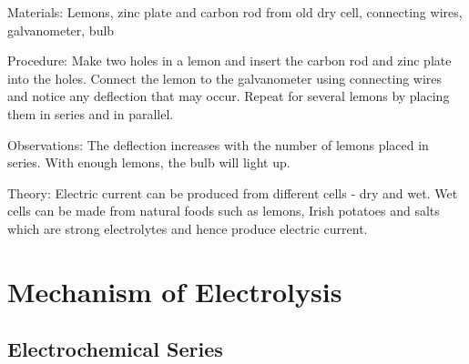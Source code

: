 \begin{multicols}{2}
\begin{description*}
\item[Materials:]{Lemons, zinc plate and carbon rod from old dry cell, connecting wires, galvanometer, bulb}
\item[Procedure:]{Make two holes in a lemon and insert the carbon rod and zinc plate into the holes. Connect the lemon to the galvanometer using connecting wires and notice any deflection that may occur. Repeat for several lemons by placing them in series and in parallel.}
\item[Observations:]{The deflection increases with the number of lemons placed in series. With enough lemons, the bulb will light up.}
\item[Theory:]{Electric current can be produced from different cells - dry and wet. Wet cells can be made from natural foods such as lemons, Irish potatoes and salts which are strong electrolytes and hence produce electric current.}
\end{description*}


\section*{Mechanism of Electrolysis} 


\subsection{Electrochemical Series} 



\end{multicols}
